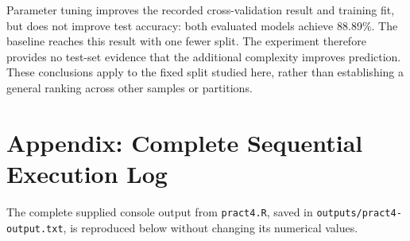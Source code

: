 \documentclass[11pt,a4paper]{article}
\begin{document}
Parameter tuning improves the recorded cross-validation result and training fit, but does not improve test accuracy: both evaluated models achieve 88.89\%. The baseline reaches this result with one fewer split. The experiment therefore provides no test-set evidence that the additional complexity improves prediction. These conclusions apply to the fixed split studied here, rather than establishing a general ranking across other samples or partitions.

\newpage
\appendix
\section*{Appendix: Complete Sequential Execution Log}
The complete supplied console output from \texttt{pract4.R}, saved in \texttt{outputs/pract4-output.txt}, is reproduced below without changing its numerical values.
\end{document}
